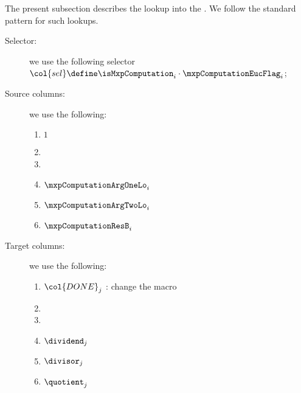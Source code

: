 The present subsection describes the lookup into the \eucMod{}.
We follow the standard pattern for such lookups.
\begin{description}
	\item[Selector:] we use the following selector $\col{sel} \define \isMxpComputation _{i} \cdot \mxpComputationEucFlag _{i}$;
	\item[Source columns:] we use the following:
		\begin{multicols}{2}
			\begin{enumerate}
				\item $1$
				\item[\vspace{\fill}]
				\item[\vspace{\fill}]
				\item $\mxpComputationArgOneLo _{i}$
				\item $\mxpComputationArgTwoLo _{i}$
				\item $\mxpComputationResB     _{i}$
			\end{enumerate}
		\end{multicols}
	\item[Target columns:] we use the following:
		\begin{multicols}{2}
			\begin{enumerate}
				\item $\col{DONE} _{j}$ \specTodo{}: change the macro
				\item[\vspace{\fill}]
				\item[\vspace{\fill}]
				\item $\dividend  _{j}$
				\item $\divisor   _{j}$
				\item $\quotient  _{j}$
			\end{enumerate}
		\end{multicols}
\end{description}

